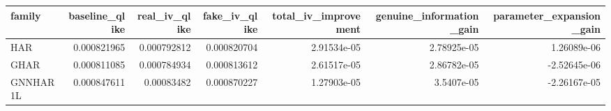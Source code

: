 \begin{tabular}{lrrrrrr}
\toprule
family & baseline_qlike & real_iv_qlike & fake_iv_qlike & total_iv_improvement & genuine_information_gain & parameter_expansion_gain \\
\midrule
HAR & 0.000821965 & 0.000792812 & 0.000820704 & 2.91534e-05 & 2.78925e-05 & 1.26089e-06 \\
GHAR & 0.000811085 & 0.000784934 & 0.000813612 & 2.61517e-05 & 2.86782e-05 & -2.52645e-06 \\
GNNHAR1L & 0.000847611 & 0.00083482 & 0.000870227 & 1.27903e-05 & 3.5407e-05 & -2.26167e-05 \\
\bottomrule
\end{tabular}
